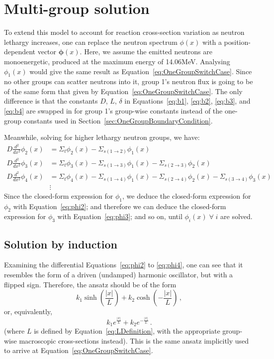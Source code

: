 \documentclass[a4paper, 12pt]{article}
\newcommand{\ve}[1]{\boldsymbol{#1}}
\begin{document}
\section{Multi-group solution}
To extend this model to account for reaction cross-section variation as neutron lethargy increases, one can replace the neutron spectrum $\phi(x)$ with a position-dependent vector $\ve{\phi}(x)$.
Here, we assume the emitted neutrons are monoenergetic, produced at the maximum energy of 14.06MeV.
Analysing $\phi_1(x)$ would give the same result as Equation~\ref{eq:OneGroupSwitchCase}.
Since no other groups can scatter neutrons into it, group 1's neutron flux is going to be of the same form that given by Equation~\ref{eq:OneGroupSwitchCase}. The only difference is that the constants $D$, $L$, $\delta$ in Equations~\ref{eq:b1}, \ref{eq:b2}, \ref{eq:b3}, and \ref{eq:b4} are swapped in for group 1's group-wise constants instead of the one-group constants used in Section~\ref{sec:OneGroupBoundaryCondition}.

Meanwhile, solving for higher lethargy neutron groups, we have:
\begin{align}
    D \frac{d^2}{dx^2}\phi_2(x) &= \Sigma_t \phi_2(x)  - \Sigma_{s(1\rightarrow 2)} \phi_1(x)\label{eq:phi2}\\
    D \frac{d^2}{dx^2}\phi_3(x) &= \Sigma_t \phi_3(x)  - \Sigma_{s(1\rightarrow 3)} \phi_1(x) - \Sigma_{s(2\rightarrow 3)} \phi_2(x)\label{eq:phi3}\\
    D \frac{d^2}{dx^2}\phi_4(x) &= \Sigma_t \phi_4(x)  - \Sigma_{s(1\rightarrow 4)} \phi_1(x) - \Sigma_{s(2\rightarrow 4)} \phi_2(x) - \Sigma_{s(3\rightarrow 4)} \phi_3(x)\label{eq:phi4}\\
    &\vdots \nonumber
\end{align}
Since the closed-form expression for $\phi_1$, we deduce the closed-form expression for $\phi_2$ with Equation~\ref{eq:phi2}; and therefore we can deduce the closed-form expression for $\phi_3$ with Equation~\ref{eq:phi3}; and so on, until $\phi_i(x)\; \forall\; i$  are solved.

\subsection{Solution by induction}
Examining the differential Equations~\ref{eq:phi2} to \ref{eq:phi4}, one can see that it resembles the form of a driven (undamped) harmonic oscillator, but with a flipped sign. Therefore, the ansatz should be of the form $$k_1 \sinh(\frac{|x|}{L}) + k_2 \cosh(-\frac{|x|}{L})\,,$$ or, equivalently, $$k_1 e^{\frac{|x|}{L}} + k_2 e^{-\frac{|x|}{L}}\,.$$
(where $L$ is defined by Equation~\ref{eq:LDefinition}, with the appropriate group-wise macroscopic cross-sections instead). This is the same ansatz implicitly used to arrive at Equation~\ref{eq:OneGroupSwitchCase}.
\end{document}
